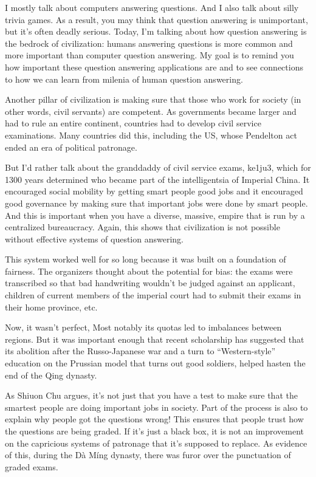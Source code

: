 I mostly talk about computers answering questions.  And I also talk about silly trivia games.  As a result, you may think that question answering is unimportant, but it’s often deadly serious.  Today, I’m talking about how question answering is the bedrock of civilization: humans answering questions is more common and more important than computer question answering.  My goal is to remind you how important these question answering applications are and to see connections to how we can learn from milenia of human question answering.

Another pillar of civilization is making sure that those who work for society (in other words, civil servants) are competent.  As governments became larger and had to rule an entire continent, countries had to develop civil service examinations.  Many countries did this, including the US, whose Pendelton act ended an era of political patronage. 

But I’d rather talk about the granddaddy of civil service exams, ke1ju3, which for 1300 years determined who became part of the intelligentsia of Imperial China.   
It encouraged social mobility by getting smart people good jobs and it encouraged good governance by making sure that important jobs were done by smart people.  And this is important when you have a diverse, massive, empire that is run by a centralized bureaucracy.  Again, this shows that civilization is not possible without effective systems of question answering.

This system worked well for so long because it was built on a foundation of fairness.  The organizers thought about the potential for bias: the exams were transcribed so that bad handwriting wouldn’t be judged against an applicant, children of current members of the imperial court had to submit their exams in their home province, etc.  

Now, it wasn’t perfect, Most notably its quotas led to imbalances between regions.  But it was important enough that recent scholarship has suggested that its abolition after the Russo-Japanese war and a turn to ``Western-style'' education on the Prussian model that turns out good soldiers, helped hasten the end of the Q\-ing dynasty.

As  Shiuon Chu argues, it’s not just that you have a test to make sure that the smartest people are doing important jobs in society.  Part of the process is also to explain why people got the questions wrong!  This ensures that people trust how the questions are being graded.  If it’s just a black box, it is not an improvement on the capricious systems of patronage that it’s supposed to replace.  As evidence of this, during the Dà Míng dynasty, there was furor over the punctuation of graded exams.

